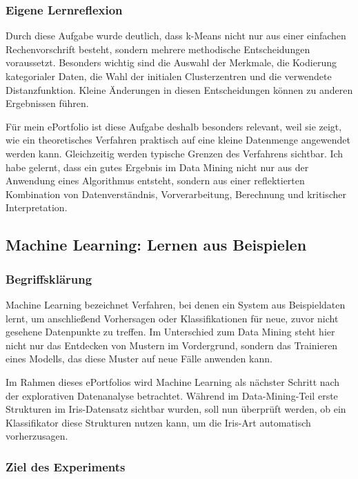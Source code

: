 \documentclass[12pt,a4paper]{article}
\begin{document}
\subsubsection{Eigene Lernreflexion}

Durch diese Aufgabe wurde deutlich, dass k-Means nicht nur aus einer einfachen Rechenvorschrift besteht, sondern mehrere methodische Entscheidungen voraussetzt. Besonders wichtig sind die Auswahl der Merkmale, die Kodierung kategorialer Daten, die Wahl der initialen Clusterzentren und die verwendete Distanzfunktion. Kleine Änderungen in diesen Entscheidungen können zu anderen Ergebnissen führen.

Für mein ePortfolio ist diese Aufgabe deshalb besonders relevant, weil sie zeigt, wie ein theoretisches Verfahren praktisch auf eine kleine Datenmenge angewendet werden kann. Gleichzeitig werden typische Grenzen des Verfahrens sichtbar. Ich habe gelernt, dass ein gutes Ergebnis im Data Mining nicht nur aus der Anwendung eines Algorithmus entsteht, sondern aus einer reflektierten Kombination von Datenverständnis, Vorverarbeitung, Berechnung und kritischer Interpretation.
\subsection{Machine Learning: Lernen aus Beispielen}

\subsubsection*{Begriffsklärung}

Machine Learning bezeichnet Verfahren, bei denen ein System aus Beispieldaten lernt, um anschließend Vorhersagen oder Klassifikationen für neue, zuvor nicht gesehene Datenpunkte zu treffen. Im Unterschied zum Data Mining steht hier nicht nur das Entdecken von Mustern im Vordergrund, sondern das Trainieren eines Modells, das diese Muster auf neue Fälle anwenden kann.

Im Rahmen dieses ePortfolios wird Machine Learning als nächster Schritt nach der explorativen Datenanalyse betrachtet. Während im Data-Mining-Teil erste Strukturen im Iris-Datensatz sichtbar wurden, soll nun überprüft werden, ob ein Klassifikator diese Strukturen nutzen kann, um die Iris-Art automatisch vorherzusagen.

\subsubsection*{Ziel des Experiments}
\end{document}
